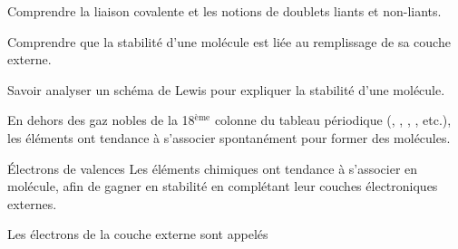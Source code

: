 \teteSndMole
{}

\begin{objectifs}
  \item Comprendre la liaison covalente et les notions de doublets liants et non-liants.
  \item Comprendre que la stabilité d'une molécule est liée au remplissage de sa couche externe.
  \item Savoir analyser un schéma de Lewis pour expliquer la stabilité d'une molécule.
\end{objectifs}

\begin{contexte}
  En dehors des gaz nobles de la 18$^\text{ème}$ colonne du tableau périodique (, , , , etc.), les éléments ont tendance à s'associer spontanément pour former des molécules. 
  
\end{contexte}



\begin{doc}{Électrons de valences}
  Les éléments chimiques ont tendance à s'associer en molécule, afin de gagner en stabilité en complétant leur couches électroniques externes.
  
  \begin{importants}  
    Les électrons de la couche externe sont appelés 
  \end{importants}  
\end{doc}
  
